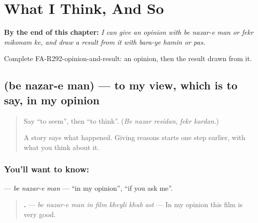 
\chapter{What I Think, And So}
\label{ch:fa-what-i-think-and-so}

\begin{chapteropening}
\textbf{By the end of this chapter:} \emph{I can give an opinion with be nazar-e man or fekr mikonam ke, and draw a result from it with bara-ye hamin or pas.}

Complete FA-R292-opinion-and-result: an opinion, then the result drawn from it.
\end{chapteropening}

\section[\texorpdfstring{\fa{به} \fa{نظر} \fa{من} (be nazar-e man)}{به نظر من (be nazar-e man)}]{   (be nazar-e man) — to my view, which is to say, in my opinion}

\label{lesson:FA-C292-be-nazar-e-man}



\begin{quote}
Say \textquotedblleft{}to seem\textquotedblright{}, then \textquotedblleft{}to think\textquotedblright{}. (\emph{Be nazar residan}, \emph{fekr kardan}.)

A story says what happened. Giving reasons starts one step earlier, with what you think about it.
\end{quote}

\subsection*{You'll want to know:   }
\textbf{  } — \emph{be nazar-e man} — \textquotedblleft{}in my opinion\textquotedblright{}, \textquotedblleft{}if you ask me\textquotedblright{}.

\begin{quote}
\textbf{       .} — \emph{be nazar-e man in film kheyli khub ast} — In my opinion this film is very good.
\end{quote}

